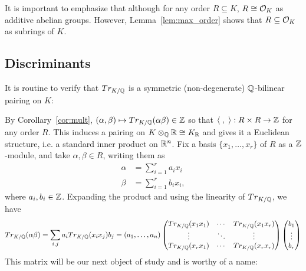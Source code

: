 \begin{rem}
It is important to emphasize that although for any order $R \subseteq K$, $R \cong \mathcal{O}_K$ as additive abelian groups. However, Lemma~\ref{lem:max_order} shows that $R \subseteq \mathcal{O}_K$ as subrings of $K$. 
\end{rem}



\subsection{Discriminants}

It is routine to verify that $Tr_{K/\mathbb{Q}}$ is a symmetric (non-degenerate) $\mathbb{Q}$-bilinear pairing on $K$:
	\begin{center}
	\end{center}
	
By Corollary~\ref{cor:mult}, $(\alpha,\beta) \mapsto Tr_{K/\mathbb{Q}}(\alpha \beta) \in \mathbb{Z}$ so that $\langle \;,\;\rangle: R \times R \to \mathbb{Z}$ for any order $R$. This induces a pairing on $K \otimes_{\mathbb{Q}} \mathbb{R} \cong K_{\mathbb{R}}$ and gives it a Euclidean structure, i.e. a standard inner product on $\mathbb{R}^n$. Fix a basis $\{ x_1, \ldots, x_r \}$ of $R$ as a $\mathbb{Z}$-module, and take $\alpha, \beta \in R$, writing them as
	\[
	\begin{split}
	\alpha&= \sum_{i=1}^r a_i x_i \\
	\beta&= \sum_{i=1}^r b_i x_i,
	\end{split}
	\]
where $a_i, b_i \in \mathbb{Z}$. Expanding the product and using the linearity of $Tr_{K/\mathbb{Q}}$, we have
	\[
	Tr_{K/\mathbb{Q}}(\alpha\beta)= \sum_{i,j} a_i Tr_{K/\mathbb{Q}}(x_ix_j)b_j= (a_1,\ldots,a_n) 
	\begin{pmatrix}
	Tr_{K/\mathbb{Q}}(x_1x_1) & \cdots & Tr_{K/\mathbb{Q}}(x_1x_r) \\
	\vdots & \ddots & \vdots \\
	Tr_{K/\mathbb{Q}}(x_rx_1) & \cdots & Tr_{K/\mathbb{Q}}(x_rx_r)
	\end{pmatrix}
	\begin{pmatrix}
	b_1 \\ \vdots \\ b_r
	\end{pmatrix}
	\]
This matrix will be our next object of study and is worthy of a name:


